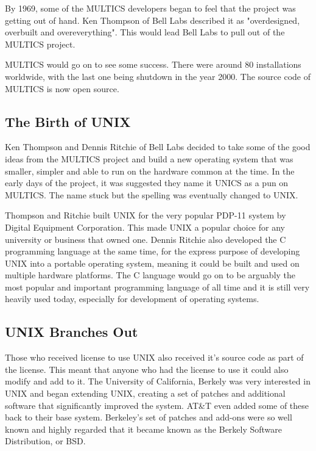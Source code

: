 By 1969, some of the MULTICS developers began to feel that the project was getting out of hand.  Ken Thompson of Bell Labs described it as "overdesigned, overbuilt and overeverything".  This would lead Bell Labs to pull out of the MULTICS project.

MULTICS would go on to see some success. There were around 80 installations worldwide, with the last one being shutdown in the year 2000. The source code of MULTICS is now open source. 

\subsection{The Birth of UNIX}

Ken Thompson and Dennis Ritchie of Bell Labs decided to take some of the good ideas from the MULTICS project and build a new operating system that was smaller, simpler and able to run on the hardware common at the time.  In the early days of the project, it was suggested they name it UNICS as a pun on MULTICS. The name stuck but the spelling was eventually changed to UNIX.

Thompson and Ritchie built UNIX for the very popular PDP-11 system by Digital Equipment Corporation.  This made UNIX a popular choice for any university or business that owned one.  Dennis Ritchie also developed the C programming language at the same time, for the express purpose of developing UNIX into a portable operating system, meaning it could be built and used on multiple hardware platforms.  The C language would go on to be arguably the most popular and important programming language of all time and it is still very heavily used today, especially for development of operating systems.

\subsection{UNIX Branches Out}

Those who received license to use UNIX also received it's source code as part of the license.  This meant that anyone who had the license to use it could also modify and add to it.  The University of California, Berkely was very interested in UNIX and began extending UNIX, creating a set of patches and additional software that significantly improved the system. AT\&T even added some of these back to their base system. Berkeley's set of patches and add-ons were so well known and highly regarded that it became known as the Berkely Software Distribution, or BSD.

